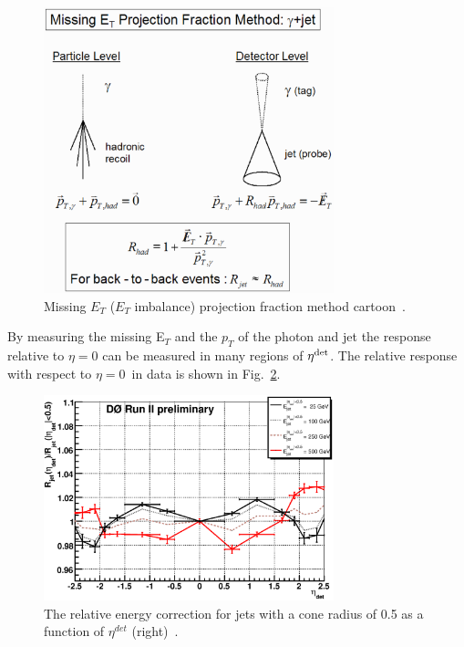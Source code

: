 \begin{itemize}
\begin{figure}[!h!tbp]
\begin{center}
\includegraphics[width=0.75\textwidth]{eps/Reco/JES-relative-method.eps}
\end{center}
\vspace{-0.1in}
\caption{Missing $E_{T}$ ($E_{T}$ imbalance) projection fraction method cartoon~\cite{jes}.}
\label{metprojection}
\end{figure}

By measuring the missing E$_{T}$ and the $p_{T}$ of the photon and jet the response relative to $\eta=0$ can be measured in many regions of $\eta^{\rm{det}}$. The relative response with respect to $\eta=0$~in data is shown in Fig.~\ref{jes-relative}.

\begin{figure}[!h!tbp]
\begin{center}
\includegraphics[width=0.75\textwidth]{eps/Reco/JES-relative.eps}
\end{center}
\vspace{-0.1in}
\caption{The relative energy correction for jets with a cone radius of 0.5 as a function of $\eta^{det}$ (right)~\cite{jes}.}
\label{jes-relative}
\end{figure}
 

\end{itemize}
